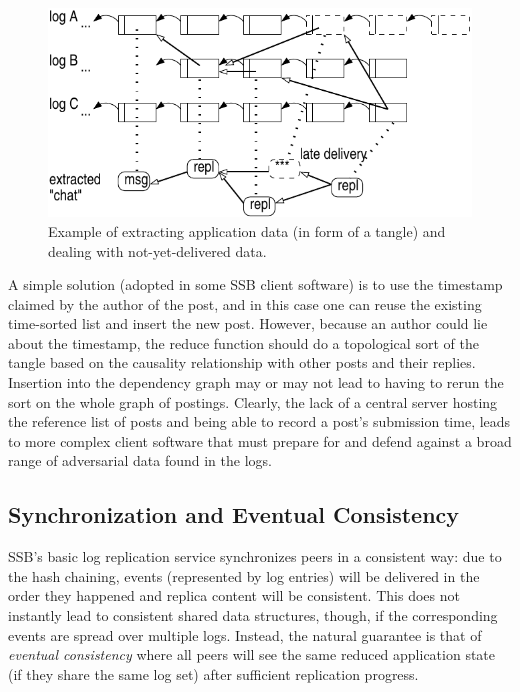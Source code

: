 \documentclass[10pt,sigconf,rewiew]{acmart}
\begin{document}
\begin{figure}[htb]
  \includegraphics[width=0.9\columnwidth]{figs/tangle.pdf}
  \caption{Example of extracting application data (in form of
    a tangle) and dealing
    with not-yet-delivered data.\label{fig:tangle}}
\end{figure}

A simple solution (adopted in some SSB client software) is to use the
timestamp claimed by the author of the post, and in this case one can
reuse the existing time-sorted list and insert the new post. However,
because an author could lie about the timestamp, the reduce function
should do a topological sort of the tangle based on the causality relationship with
other posts and their replies. Insertion into the dependency graph may
or may not lead to having to rerun the sort on the whole graph of
postings. Clearly, the lack of a central server hosting the reference
list of posts and being able to record a post's submission time, leads
to more complex client software that must prepare for and defend
against a broad range of adversarial data found in the logs.

\subsection{Synchronization and Eventual Consistency}
\label{Section:Tangle}

SSB's basic log replication service synchronizes peers in a consistent
way: due to the hash chaining, events (represented by log entries)
will be delivered in the order they happened and replica content will
be consistent. This does not instantly lead to consistent shared data
structures, though, if the corresponding events are spread over
multiple logs. Instead, the natural guarantee is that of {\em eventual
  consistency} where all peers will see the same reduced application
state (if they share the same log set) after sufficient replication
progress.
\end{document}
